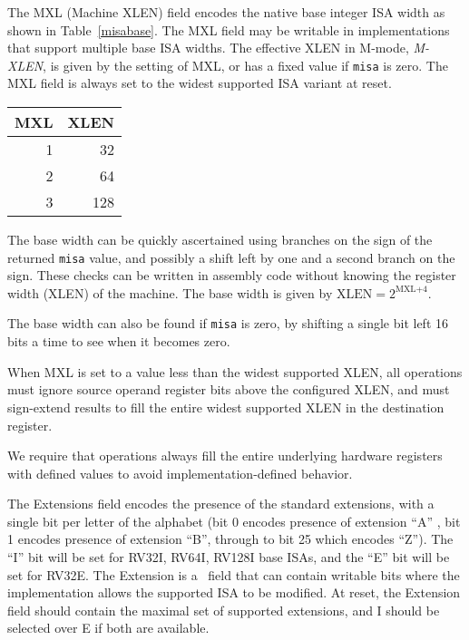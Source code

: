 The MXL (Machine XLEN) field encodes the native base integer ISA width
as shown in Table~\ref{misabase}.  The MXL field may be writable in
implementations that support multiple base ISA widths.  The effective
XLEN in M-mode, {\em M-XLEN}, is given by the setting of MXL, or has a
fixed value if {\tt misa} is zero.  The MXL field is always set to the
widest supported ISA variant at reset.

\begin{table*}[h!]
\begin{center}
\begin{tabular}{|r|r|}
\hline
MXL  & XLEN \\
\hline	 
1   & 32 \\
2   & 64 \\
3   & 128 \\
\hline
\end{tabular}
\end{center}
\caption{Encoding of MXL field in {\tt misa}}
\label{misabase}
\end{table*}

\begin{commentary}
The base width can be quickly ascertained using branches on the sign
of the returned {\tt misa} value, and possibly a shift left by one and
a second branch on the sign.  These checks can be written in assembly
code without knowing the register width (XLEN) of the machine.  The
base width is given by $\mbox{XLEN}=2^{\mbox{MXL+4}}$.

The base width can also be found if {\tt misa} is zero, by shifting a
single bit left 16 bits a time to see when it becomes zero.
\end{commentary}

When MXL is set to a value less than the widest supported XLEN, all
operations must ignore source operand register bits above the
configured XLEN, and must sign-extend results to fill the entire
widest supported XLEN in the destination register.

\begin{commentary}
We require that operations always fill the entire underlying hardware
registers with defined values to avoid implementation-defined
behavior.
\end{commentary}

The Extensions field encodes the presence of the standard extensions,
with a single bit per letter of the alphabet (bit 0 encodes presence
of extension ``A'' , bit 1 encodes presence of extension ``B'',
through to bit 25 which encodes ``Z'').  The ``I'' bit will be set for
RV32I, RV64I, RV128I base ISAs, and the ``E'' bit will be set for
RV32E.  The Extension is a \warl\ field that can contain writable bits
where the implementation allows the supported ISA to be modified.  At
reset, the Extension field should contain the maximal set of supported
extensions, and I should be selected over E if both are available.

